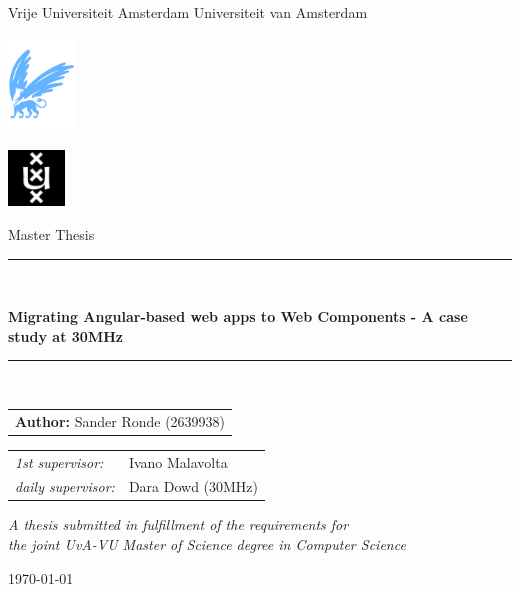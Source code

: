 \documentclass[oneside,11pt]{lib/PhDthesisPSnPDF}
\begin{document}
\thispagestyle{empty}

\begin{center}

	Vrije Universiteit Amsterdam \hspace*{2cm} Universiteit van Amsterdam

	\vspace{1mm}

	\hspace*{-7.5cm}\includegraphics[height=25mm]{figures/front/vu-griffioen.pdf}

	\vspace*{-2cm}\hspace*{7.5cm}\includegraphics[height=15mm]{figures/front/uva_logo.jpg}

	\vspace{2cm}

	{\Large Master Thesis}

	\vspace*{1.5cm}

	\rule{.9\linewidth}{.6pt}\\[0.4cm]
	{\huge \bfseries Migrating Angular-based web apps to Web Components - A case study at 30MHz \par}\vspace{0.4cm}
	\rule{.9\linewidth}{.6pt}\\[1.5cm]

	\vspace*{2mm}

	{\Large
		\begin{tabular}{l}
			{\bf Author:} Sander Ronde (2639938)
		\end{tabular}
	}

	\vspace*{2cm}

	\begin{tabular}{ll}
		{\it 1st supervisor:}   & Ivano Malavolta   \\
		{\it daily supervisor:} & Dara Dowd (30MHz) \\
	\end{tabular}

	\vspace*{2.5cm}

	\textit{A thesis submitted in fulfillment of the requirements for\\ the joint UvA-VU Master of Science degree in Computer Science}

	\vspace*{1.8cm}

	\today\\[4cm] %

\end{center}
\end{document}
